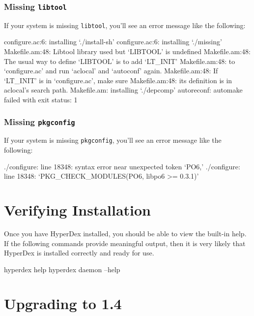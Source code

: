 \subsubsection{Missing \texttt{libtool}}
\label{sec:installation:troubleshooting:libtool}

If your system is missing \texttt{libtool}, you'll see an error message like the
following:

\begin{consolecode}
configure.ac:6: installing `./install-sh'
configure.ac:6: installing `./missing'
Makefile.am:48: Libtool library used but `LIBTOOL' is undefined
Makefile.am:48:   The usual way to define `LIBTOOL' is to add `LT_INIT'
Makefile.am:48:   to `configure.ac' and run `aclocal' and `autoconf' again.
Makefile.am:48:   If `LT_INIT' is in `configure.ac', make sure
Makefile.am:48:   its definition is in aclocal's search path.
Makefile.am: installing `./depcomp'
autoreconf: automake failed with exit status: 1
\end{consolecode}

\subsubsection{Missing \texttt{pkgconfig}}
\label{sec:installation:troubleshooting:pkgconfig}

If your system is missing \texttt{pkgconfig}, you'll see an error message like
the following:

\begin{consolecode}
./configure: line 18348: syntax error near unexpected token `PO6,'
./configure: line 18348: `PKG_CHECK_MODULES(PO6, libpo6 >= 0.3.1)'
\end{consolecode}

\section{Verifying Installation}
\label{sec:installation:verify}

Once you have HyperDex installed, you should be able to view the built-in help.
If the following commands provide meaningful output, then it is very likely that
HyperDex is installed correctly and ready for use.

\begin{consolecode}
hyperdex help
hyperdex daemon --help
\end{consolecode}

\section{Upgrading to 1.4}
\label{sec:installation:upgrade1.4}

